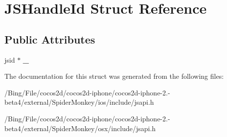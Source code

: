 \hypertarget{struct_j_s_handle_id}{\section{J\-S\-Handle\-Id Struct Reference}
\label{struct_j_s_handle_id}
}
\subsection*{Public Attributes}
\begin{DoxyCompactItemize}
\item 
\hypertarget{struct_j_s_handle_id_ae5e94ef45e3dd50f122d446f62476713}{jsid $\ast$ {\bfseries \-\_\-}}\label{struct_j_s_handle_id_ae5e94ef45e3dd50f122d446f62476713}

\end{DoxyCompactItemize}


The documentation for this struct was generated from the following files\-:\begin{DoxyCompactItemize}
\item 
/\-Bing/\-File/cocos2d/cocos2d-\/iphone/cocos2d-\/iphone-\/2.-\/beta4/external/\-Spider\-Monkey/ios/include/jsapi.\-h\item 
/\-Bing/\-File/cocos2d/cocos2d-\/iphone/cocos2d-\/iphone-\/2.-\/beta4/external/\-Spider\-Monkey/osx/include/jsapi.\-h\end{DoxyCompactItemize}
